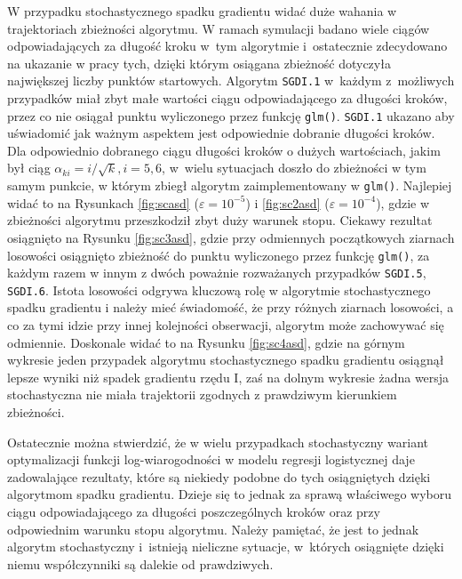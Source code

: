 W przypadku stochastycznego spadku gradientu widać duże wahania w trajektoriach zbieżności algorytmu. W ramach symulacji badano wiele ciągów odpowiadających za długość kroku w~tym algorytmie i~ostatecznie zdecydowano na ukazanie w pracy tych, dzięki którym osiągana zbieżność dotyczyła największej liczby punktów startowych. Algorytm \texttt{SGDI.1} w~każdym z~możliwych przypadków miał zbyt małe wartości ciągu odpowiadającego za długości kroków, przez co nie osiągał punktu wyliczonego przez funkcję \texttt{glm()}. \texttt{SGDI.1} ukazano aby uświadomić jak ważnym aspektem jest odpowiednie dobranie długości kroków. Dla odpowiednio dobranego ciągu długości kroków o dużych wartościach, jakim był ciąg $\alpha_{ki} = i/\sqrt{k}, i = 5, 6$, w~wielu sytuacjach doszło do zbieżności w tym samym punkcie, w którym zbiegł algorytm zaimplementowany w \texttt{glm()}. Najlepiej widać to na Rysunkach \ref{fig:scasd} ($\varepsilon = 10^{-5}$) i \ref{fig:sc2asd} ($\varepsilon = 10^{-4}$), gdzie w zbieżności algorytmu przeszkodził zbyt duży warunek stopu. Ciekawy rezultat osiągnięto na Rysunku \ref{fig:sc3asd}, gdzie przy odmiennych początkowych ziarnach losowości osiągnięto zbieżność do punktu wyliczonego przez funkcję \texttt{glm()}, za każdym razem w innym z dwóch poważnie rozważanych przypadków \texttt{SGDI.5}, \texttt{SGDI.6}. Istota losowości odgrywa kluczową rolę w algorytmie stochastycznego spadku gradientu i należy mieć świadomość, że przy różnych ziarnach losowości, a co za tymi idzie przy innej kolejności obserwacji, algorytm może zachowywać się odmiennie. Doskonale widać to na Rysunku \ref{fig:sc4asd}, gdzie na górnym wykresie jeden przypadek algorytmu stochastycznego spadku gradientu osiągnął lepsze wyniki niż spadek gradientu rzędu I, zaś na dolnym wykresie żadna wersja stochastyczna nie miała trajektorii zgodnych z prawdziwym kierunkiem zbieżności.

Ostatecznie można stwierdzić, że w wielu przypadkach stochastyczny wariant optymalizacji funkcji log-wiarogodności w modelu regresji logistycznej daje zadowalające rezultaty, które są niekiedy podobne do tych osiągniętych dzięki algorytmom spadku gradientu. Dzieje się to jednak za sprawą właściwego wyboru ciągu odpowiadającego za długości poszczególnych kroków oraz przy odpowiednim warunku stopu algorytmu. Należy pamiętać, że jest to jednak algorytm stochastyczny i~istnieją nieliczne sytuacje, w~których osiągnięte dzięki niemu współczynniki są dalekie od prawdziwych.



